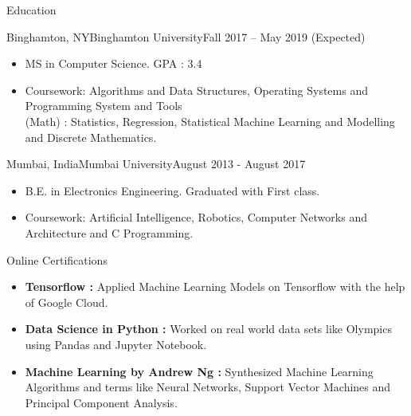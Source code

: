 \documentclass[]{mcdowellcv}
\begin{document}
	\makeheader
	\vspace{-2mm}
	\begin{cvsection}{Education}
		\begin{cvsubsection}{Binghamton, NY}{Binghamton University}{Fall 2017 -- May 2019 (Expected)}
			\begin{itemize}
				\item MS in Computer Science. GPA : 3.4
				\item Coursework: Algorithms and Data Structures, Operating Systems and Programming System and Tools \\
				(Math) : Statistics, Regression, Statistical Machine Learning and Modelling and Discrete Mathematics.
			 \end{itemize}
	    \end{cvsubsection}
		\vspace{-3mm}
		\begin{cvsubsection}{Mumbai, India}{Mumbai University}{August 2013 - August 2017}
		    \begin{itemize}
				\item B.E. in Electronics Engineering. Graduated with First class.
				\item Coursework: Artificial Intelligence, Robotics, Computer Networks and Architecture and C Programming. 
			\end{itemize}
		\end{cvsubsection}
		\vspace{-3mm}
		\begin{cvsubsection}{Online Certifications}{}{}
		    \begin{itemize}
		        \item \textbf{Tensorflow :} Applied Machine Learning Models on Tensorflow with the help of Google Cloud. 
		        \item \textbf{Data Science in Python :} Worked on real world data sets like Olympics using Pandas and Jupyter Notebook.
		        \item \textbf{Machine Learning by Andrew Ng :}
		        Synthesized Machine Learning Algorithms and terms like Neural Networks, Support Vector Machines and Principal Component Analysis.
		    \end{itemize}
		\end{cvsubsection}
	\end{cvsection}
	\vspace{-5mm}
\end{document}
